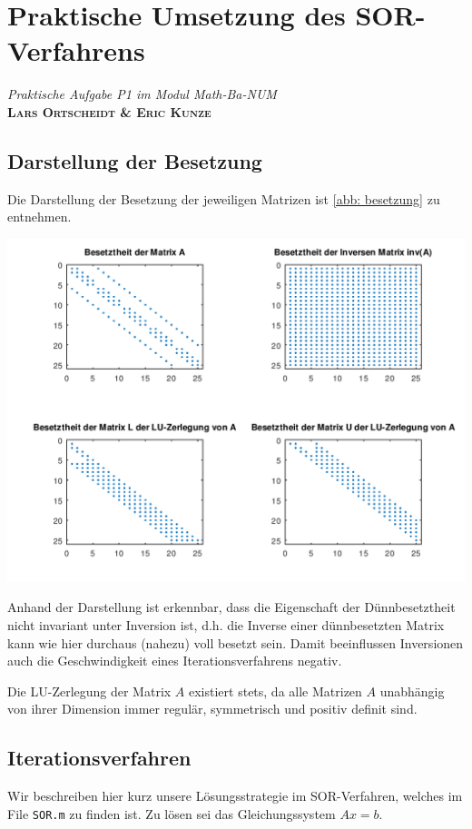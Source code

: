 \documentclass[ %
ngerman, %
a4paper, %
sectionreset, %
chapterstyle=framed, %
sectionstyle=dotted, %
titlefont=osfamily %
]{../../../../texmf/tex/latex/mathscriptMathTUD/mathscriptMathTUD}
\institute{Numerik}
\begin{document}
    
    \chapter*{Praktische Umsetzung des SOR-Verfahrens}
    \begin{center}
    	\textit{Praktische Aufgabe P1 im Modul Math-Ba-NUM} \\
    	\Large{\bfseries \textsc{Lars Ortscheidt \& Eric Kunze}}
    \end{center}
    
    \section{Darstellung der Besetzung}
    Die Darstellung der Besetzung der jeweiligen Matrizen ist \cref{abb: besetzung}
	zu entnehmen.
	\begin{center}
		\includegraphics[scale=0.5]{besetztheit.png}
		\label{abb: besetzung}
	\end{center}
	
	Anhand der Darstellung ist erkennbar, dass die Eigenschaft der Dünnbesetztheit nicht invariant unter Inversion ist, d.h. die Inverse einer dünnbesetzten Matrix kann wie hier durchaus (nahezu) voll besetzt sein. Damit beeinflussen Inversionen auch die Geschwindigkeit eines Iterationsverfahrens negativ.
	
	Die LU-Zerlegung der Matrix $A$ existiert stets, da alle Matrizen $A$ unabhängig von ihrer Dimension immer regulär, symmetrisch und positiv definit sind.
	
	\section{Iterationsverfahren}
	Wir beschreiben hier kurz unsere Lösungsstrategie im SOR-Verfahren, welches im File \texttt{SOR.m} zu finden ist. Zu lösen sei das Gleichungssystem $Ax = b$. 
	
\end{document}
